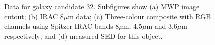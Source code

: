 \documentclass[times,usenatbib]{mn2e}
\begin{document}
\begin{figure}
\begin{center}
\caption{Data for galaxy candidate 32. Subfigures show (a) MWP image cutout; (b) IRAC 8$\mu$m data; (c) Three-colour composite with RGB channels using Spitzer IRAC bands 8$\mu$m, 4.5$\mu$m and 3.6$\mu$m respectively; and (d) measured SED for this object.}
\label{gal32}
\end{center}
\end{figure} 
\end{document}
